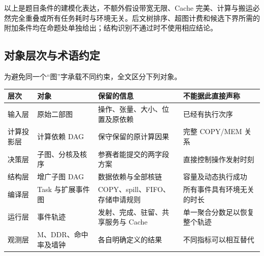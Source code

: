 \documentclass[anonymous,notoc]{gmcm2026}
\begin{document}
以上是题目条件的建模化表达，不额外假设带宽无限、Cache 完美、计算与搬运必然完全重叠或所有任务耗时与环境无关。后文树排序、超图计费和候选下界所需的附加条件均在命题处单独给出；结构识别不通过时不使用相应结论。

\subsection{对象层次与术语约定}\label{ux5bf9ux8c61ux5c42ux6b21ux4e0eux672fux8bedux7ea6ux5b9a}

为避免同一个``图''字承载不同约束，全文区分下列对象。

{\def\LTcaptype{table} %
\begin{longtable}[]{@{}
  >{\raggedright\arraybackslash}p{}
  >{\raggedright\arraybackslash}p{}
  >{\raggedright\arraybackslash}p{}
  >{\raggedright\arraybackslash}p{}@{}}
\toprule\noalign{}
\begin{minipage}[b]{\linewidth}\raggedright
层次
\end{minipage} & \begin{minipage}[b]{\linewidth}\raggedright
对象
\end{minipage} & \begin{minipage}[b]{\linewidth}\raggedright
保留的信息
\end{minipage} & \begin{minipage}[b]{\linewidth}\raggedright
不能据此直接声称
\end{minipage} \\
\midrule\noalign{}
\endhead
\bottomrule\noalign{}
\endlastfoot
输入层 & 原始二部图 & 操作、张量、大小、位置及原依赖 & 已经有执行次序 \\
计算投影层 & 计算依赖 DAG & 保守保留的原计算因果 & 完整 COPY/MEM 关系 \\
决策层 & 子图、分核及核序 & 参赛者能提交的两字段方案 & 直接控制操作发射时刻 \\
结构层 & 增广子图 DAG & 数据依赖与全部核链 & 容量及动态执行成功 \\
编译层 & Task 与扩展事件图 & COPY、spill、FIFO、存储申请规则 & 所有事件具有环境无关的时长 \\
运行层 & 事件轨迹 & 发射、完成、驻留、共享服务与 Cache & 单一聚合分数足以恢复整个轨迹 \\
观测层 & M、DDR、命中率及墙钟 & 各自明确定义的结果 & 不同指标可以相互替代 \\
\end{longtable}
}
\end{document}
